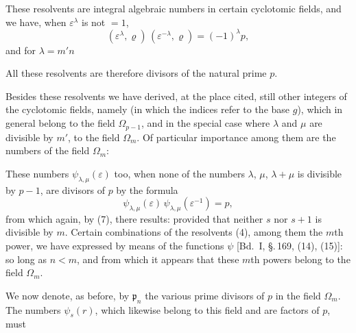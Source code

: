 These resolvents are integral algebraic numbers in certain
cyclotomic fields, and we have, when $\varepsilon^\lambda$ is not $=1$,
\[
(\varepsilon^\lambda,\varrho)\,(\varepsilon^{-\lambda},\varrho) = (-1)^\lambda p,
\]
and for $\lambda = m'n$

All these resolvents are therefore divisors of the natural
prime $p$.

Besides these resolvents we have derived, at the place cited,
still other integers of the cyclotomic fields, namely
(in which the indices refer to the base $g$), which in general belong to the field $\Omega_{p-1}$, and in the special case where $\lambda$ and $\mu$ are divisible by $m'$, to the field $\Omega_m$. Of particular importance among them are the numbers of the field $\Omega_m$:

These numbers $\psi_{\lambda,\mu}(\varepsilon)$ too, when none of the numbers $\lambda$, $\mu$, $\lambda+\mu$ is divisible by $p-1$, are divisors of $p$ by the formula
\[
\psi_{\lambda,\mu}(\varepsilon)\,\psi_{\lambda,\mu}(\varepsilon^{-1}) = p,
\]
from which again, by (7), there results:
provided that neither $s$ nor $s+1$ is divisible by $m$. Certain combinations of the resolvents (4), among them the $m$th power, we have expressed by means of the functions $\psi$ [Bd.\ I, \S.\,169, (14), (15)]:
so long as $n<m$, and
from which it appears that these $m$th powers belong to the field $\Omega_m$.

We now denote, as before, by $\mathfrak{p}_n$ the various
prime divisors of $p$ in the field $\Omega_m$. The numbers $\psi_s(r)$, which likewise belong to this field and are factors of $p$, must
